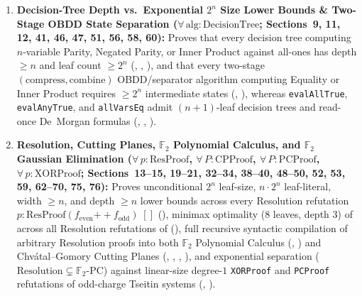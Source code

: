 \documentclass[11pt,a4paper]{article}
\theoremstyle{definition}
\begin{document}
{\begin{enumerate}
    \item \textbf{Decision-Tree Depth vs.\ Exponential $2^n$ Size Lower Bounds \& Two-Stage OBDD State Separation ($\forall\,\mathrm{alg} : \mathrm{DecisionTree}$; Sections~9, 11, 12, 41, 46, 47, 51, 56, 58, 60):} Proves that every decision tree computing $n$-variable Parity, Negated Parity, or Inner Product against all-ones has depth $\ge n$ and leaf count $\ge 2^n$ (, , ), and that every two-stage $(\mathrm{compress}, \mathrm{combine})$ OBDD/separator algorithm computing Equality or Inner Product requires $\ge 2^n$ intermediate states (, ), whereas \texttt{evalAllTrue}, \texttt{evalAnyTrue}, and \texttt{allVarsEq} admit $(n+1)$-leaf decision trees and read-once De~Morgan formulas (, , ).
    \item \textbf{Resolution, Cutting Planes, $\mathbb{F}_2$ Polynomial Calculus, and $\mathbb{F}_2$ Gaussian Elimination ($\forall\,p : \mathrm{ResProof}$, $\forall\,P : \mathrm{CPProof}$, $\forall\,P : \mathrm{PCProof}$, $\forall\,p : \mathrm{XORProof}$; Sections~13--15, 19--21, 32--34, 38--40, 48--50, 52, 53, 59, 62--70, 75, 76):} Proves unconditional $2^n$ leaf-size, $n\cdot 2^n$ leaf-literal, width $\ge n$, and depth $\ge n$ lower bounds across every Resolution refutation $p : \mathrm{ResProof}(f_{\mathrm{even}} \mathbin{+\!+} f_{\mathrm{odd}})\;[]$ (), minimax optimality ($8$ leaves, depth $3$) of  across all Resolution refutations of  (), full recursive syntactic compilation of arbitrary Resolution proofs into both $\mathbb{F}_2$ Polynomial Calculus (, ) and Chv\'{a}tal--Gomory Cutting Planes (, , , ), and exponential separation ($\text{Resolution} \subsetneq \mathbb{F}_2\text{-PC}$) against linear-size degree-$1$ \texttt{XORProof} and \texttt{PCProof} refutations of odd-charge Tseitin systems (, ).

\end{enumerate}}
\end{document}
